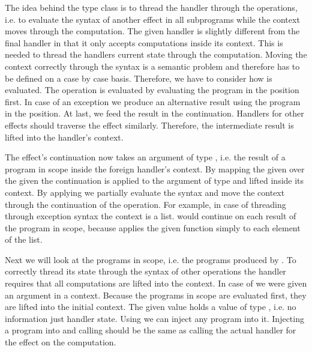 The idea behind the  type class is to thread the handler
through the operations, i.e. to evaluate the syntax of another effect in all
subprograms while the context moves through the computation.
The given handler  is slightly different from the final
handler in that it only accepts computations inside its context.
This is needed to thread the handlers current state through the computation.
Moving the context correctly through the syntax is a semantic problem and
therefore has to be defined on a case by case basis.
Therefore, we have to consider how  is evaluated.
The  operation is evaluated by evaluating the program in
the  position first.
In case of an exception we produce an alternative result using the program in
the  position.
At last, we feed the result in the continuation.
Handlers for other effects should traverse the effect similarly.
Therefore, the intermediate result is lifted into the handler's context.

The effect's continuation  now takes an argument of type
, i.e. the result of a program in scope inside the foreign
handler's context.
By mapping the given  over the given  the
continuation is applied to the argument of type  and lifted
inside its context.
By applying  we partially evaluate the syntax and move the
context through the continuation of the operation.
For example, in case of threading  through exception
syntax the context is a list.
 would continue on each result of the program in scope,
because \AgdaFunction{<\$>} applies the given function simply to each element of
the list.

Next we will look at the programs in scope, i.e. the programs produced by
.
To correctly thread its state through the syntax of other operations the handler
requires that all computations are lifted into the context.
In case of  we were given an argument in a context.
Because the programs in scope are evaluated first, they are lifted into the
initial context.
The given value  holds a value of type , i.e.
no information just handler state.
Using \AgdaFunction{<\$} we can inject any program into it.
Injecting a program into  and calling 
should be the same as calling the actual handler for the effect on the
computation.

